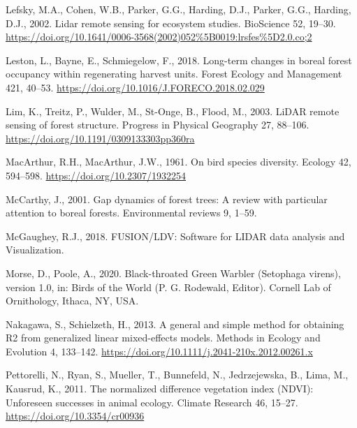 \documentclass[
]{article}
\newlength{\cslhangindent}
\newlength{\cslentryspacingunit} %
\newenvironment{CSLReferences}[2] %
 {%
  \setlength{\parindent}{0pt}
  \ifodd #1
  \let\oldpar\par
  \def\par{\hangindent=\cslhangindent\oldpar}
  \fi
  \setlength{\parskip}{#2\cslentryspacingunit}
 }%
 {}
\begin{document}
\begin{CSLReferences}{1}{0}
\leavevmode{}%
Lefsky, M.A., Cohen, W.B., Parker, G.G., Harding, D.J., Parker, G.G., Harding, D.J., 2002. Lidar remote sensing for ecosystem studies. BioScience 52, 19--30. \url{https://doi.org/10.1641/0006-3568(2002)052\%5B0019:lrsfes\%5D2.0.co;2}

\leavevmode{}%
Leston, L., Bayne, E., Schmiegelow, F., 2018. Long-term changes in boreal forest occupancy within regenerating harvest units. Forest Ecology and Management 421, 40--53. \url{https://doi.org/10.1016/J.FORECO.2018.02.029}

\leavevmode{}%
Lim, K., Treitz, P., Wulder, M., St-Onge, B., Flood, M., 2003. {LiDAR} remote sensing of forest structure. Progress in Physical Geography 27, 88--106. \url{https://doi.org/10.1191/0309133303pp360ra}

\leavevmode{}%
MacArthur, R.H., MacArthur, J.W., 1961. On bird species diversity. Ecology 42, 594--598. \url{https://doi.org/10.2307/1932254}

\leavevmode{}%
McCarthy, J., 2001. Gap dynamics of forest trees: A review with particular attention to boreal forests. Environmental reviews 9, 1--59.

\leavevmode{}%
McGaughey, R.J., 2018. {FUSION}/{LDV}: {Software} for {LIDAR} data analysis and {Visualization}.

\leavevmode{}%
Morse, D., Poole, A., 2020. Black-throated {Green} {Warbler} ({Setophaga} virens), version 1.0, in: Birds of the {World} ({P}. {G}. {Rodewald}, {Editor}). Cornell Lab of Ornithology, Ithaca, NY, USA.

\leavevmode{}%
Nakagawa, S., Schielzeth, H., 2013. A general and simple method for obtaining {R2} from generalized linear mixed-effects models. Methods in Ecology and Evolution 4, 133--142. \url{https://doi.org/10.1111/j.2041-210x.2012.00261.x}

\leavevmode{}%
Pettorelli, N., Ryan, S., Mueller, T., Bunnefeld, N., Jedrzejewska, B., Lima, M., Kausrud, K., 2011. The normalized difference vegetation index ({NDVI}): Unforeseen successes in animal ecology. Climate Research 46, 15--27. \url{https://doi.org/10.3354/cr00936}


\end{CSLReferences}
\end{document}
